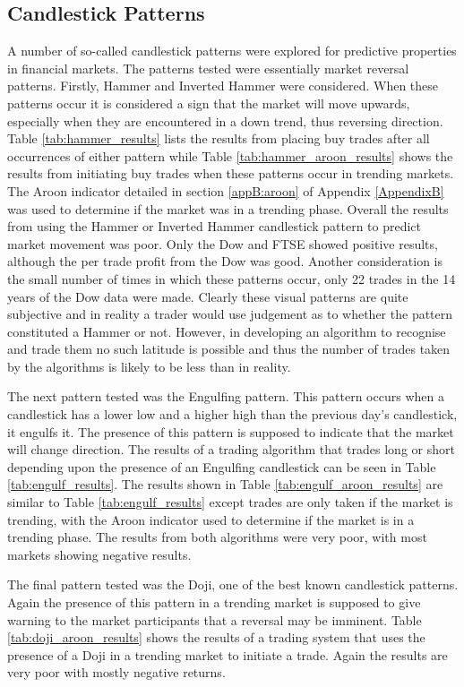 \subsection{Candlestick Patterns}
A number of so-called candlestick patterns were explored for predictive properties in financial markets. The patterns tested were essentially market reversal patterns. Firstly, Hammer and Inverted Hammer were considered. When these patterns occur it is considered a sign that the market will move upwards, especially when they are encountered in a down trend, thus reversing direction. Table \ref{tab:hammer_results} lists the results from placing buy trades after all occurrences of either pattern while Table \ref{tab:hammer_aroon_results} shows the results from initiating buy trades when these patterns occur in trending markets. The Aroon indicator detailed in section \ref{appB:aroon} of Appendix \ref{AppendixB} was used to determine if the market was in a trending phase. Overall the results from using the Hammer or Inverted Hammer candlestick pattern to predict market movement was poor. Only the Dow and FTSE showed positive results, although the per trade profit from the Dow was good. Another consideration is the small number of times in which these patterns occur, only 22 trades in the 14 years of the Dow data were made.  Clearly these visual patterns are quite subjective and in reality a trader would use judgement as to whether the pattern constituted a Hammer or not. However, in developing an algorithm to recognise and trade them no such latitude is possible and thus the number of trades taken by the algorithms is likely to be less than in reality.

The next pattern tested was the Engulfing pattern. This pattern occurs when a candlestick has a lower low and a higher high than the previous day's candlestick, it engulfs it. The presence of this pattern is supposed to indicate that the market will change direction. The results of a trading algorithm that trades long or short depending upon the presence of an Engulfing candlestick can be seen in Table \ref{tab:engulf_results}. The results shown in Table \ref{tab:engulf_aroon_results} are similar to Table \ref{tab:engulf_results} except trades are only taken if the market is trending, with the Aroon indicator used to determine if the market is in a trending phase. The results from both algorithms were very poor, with most markets showing negative results.

The final pattern tested was the Doji, one of the best known candlestick patterns. Again the presence of this pattern in a trending market is supposed to give warning to the market participants that a reversal may be imminent. Table \ref{tab:doji_aroon_results} shows the results of a trading system that uses the presence of a Doji in a trending market to initiate a trade. Again the results are very poor with mostly negative returns.

